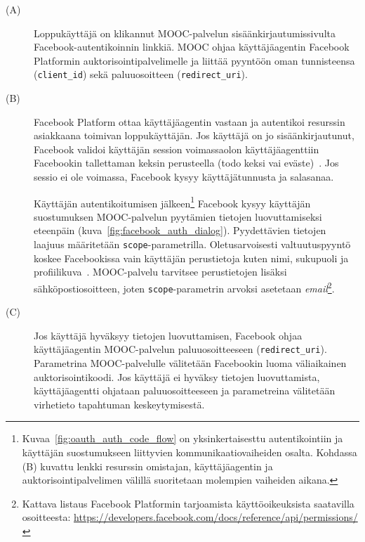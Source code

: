 \documentclass[finnish,gradu]{tktltiki}
\begin{document}
  \begin{description}
  \item[(A)]
   Loppukäyttäjä on klikannut MOOC-palvelun sisäänkirjautumissivulta Facebook-autentikoinnin linkkiä.
   MOOC ohjaa käyttäjäagentin Facebook Platformin auktorisointipalvelimelle ja liittää pyyntöön oman tunnisteensa (\verb!client_id!) sekä paluuosoitteen (\verb!redirect_uri!).

  \item[(B)]
  Facebook Platform ottaa käyttäjäagentin vastaan ja autentikoi resurssin asiakkaana toimivan loppukäyttäjän. Jos käyttäjä on jo sisäänkirjautunut, Facebook validoi käyttäjän session voimassaolon  käyttäjäagenttiin Facebookin tallettaman keksin perusteella (todo keksi vai eväste)~\cite{facebook_oauth2_doc}. Jos sessio ei ole voimassa, Facebook kysyy käyttäjätunnusta ja salasanaa.

  Käyttäjän autentikoitumisen jälkeen\footnote{
    Kuvaa~\ref{fig:oauth_auth_code_flow} on yksinkertaisesttu autentikointiin ja käyttäjän suostumukseen liittyvien kommunikaatiovaiheiden osalta. Kohdassa (B) kuvattu lenkki resurssin omistajan, käyttäjäagentin ja auktorisointipalvelimen välillä suoritetaan molempien vaiheiden aikana.
  }
  Facebook kysyy käyttäjän suostumuksen MOOC-palvelun pyytämien tietojen luovuttamiseksi eteenpäin (kuva~\ref{fig:facebook_auth_dialog}). Pyydettävien tietojen laajuus määritetään \verb!scope!-parametrilla. Oletusarvoisesti valtuutuspyyntö koskee Facebookissa vain käyttäjän perustietoja kuten nimi, sukupuoli ja profiilikuva~\cite{facebook_oauth2_doc}. MOOC-palvelu tarvitsee perustietojen lisäksi sähköpostiosoitteen, joten \verb!scope!-parametrin arvoksi asetetaan \emph{email}\footnote{
    Kattava listaus Facebook Platformin tarjoamista käyttöoikeuksista saatavilla osoitteesta:
    \url{https://developers.facebook.com/docs/reference/api/permissions/}
  }.


  \item[(C)]

  Jos käyttäjä hyväksyy tietojen luovuttamisen, Facebook ohjaa käyttäjäagentin MOOC-palvelun paluuosoitteeseen (\verb!redirect_uri!). Parametrina MOOC-palvelulle välitetään Facebookin luoma väliaikainen auktorisointikoodi.
  Jos käyttäjä ei hyväksy tietojen luovuttamista, käyttäjäagentti ohjataan paluuosoitteeseen
  ja parametreina välitetään virhetieto tapahtuman keskeytymisestä.


\end{description}
\end{document}
